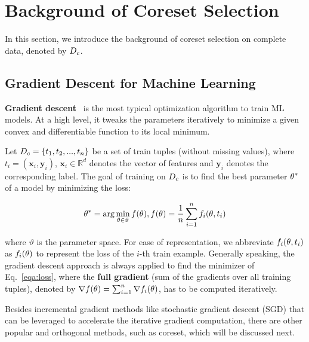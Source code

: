 \section{Background of Coreset Selection} 
\label{sec:pre}

In this section, we introduce the background of coreset selection on complete data, denoted by $D_c$.

\subsection{Gradient Descent for Machine Learning}

{\bf Gradient descent}~\cite{lemarechal2012cauchy} is the most typical optimization algorithm to train ML models. 
At a high level, it  tweaks the parameters iteratively to minimize a given convex and differentiable function to its local minimum.

Let $D_c = \{t_1, t_2, ..., t_n \}$ be a set of train tuples (without missing values), where $t_i = (\mathbf{x}_i, \mathbf{y}_i)$, $\mathbf{x}_i \in \mathbb{R}^d$ denotes the vector of features and $\mathbf{y}_i$ denotes the corresponding label. The goal of training on $D_c$ is to find the best parameter  $\theta^*$ of a model by minimizing the loss:

\vspace{-0.5em}
\begin{equation}\label{eqa:loss}
\theta^* = \arg\min_{\theta\in \vartheta}f(\theta), f(\theta)=\frac{1}{n}\sum_{i=1}^nf_i (\theta, t_i) 
\end{equation}

\noindent where $\vartheta$ is the parameter space. For ease of representation, we abbreviate $f_i (\theta, t_i)$ as $f_i(\theta)$ to represent the loss of the $i$-th train example.  Generally speaking, the gradient descent approach is always applied to find the minimizer of  Eq.~\ref{eqa:loss}, where  the {\bf full gradient} (sum of the gradients over all training tuples), denoted by $\nabla f(\theta) = \sum_{i=1}^{n}\nabla f_i(\theta)$, has to be computed iteratively. 

Besides incremental gradient methods like stochastic gradient descent (SGD) that can be leveraged to accelerate the iterative gradient computation, there are other popular and orthogonal methods, such as coreset, which will be discussed next.

